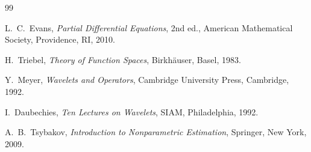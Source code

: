 \documentclass[12pt]{article}
\theoremstyle{remark}
\begin{document}
\begin{thebibliography}{99}

L.~C.~Evans,
\emph{Partial Differential Equations}, 2nd ed.,
American Mathematical Society, Providence, RI, 2010.

H.~Triebel,
\emph{Theory of Function Spaces},
Birkh\"auser, Basel, 1983.

Y.~Meyer,
\emph{Wavelets and Operators},
Cambridge University Press, Cambridge, 1992.

I.~Daubechies,
\emph{Ten Lectures on Wavelets},
SIAM, Philadelphia, 1992.

A.~B.~Tsybakov,
\emph{Introduction to Nonparametric Estimation},
Springer, New York, 2009.

\end{thebibliography}
\end{document}
